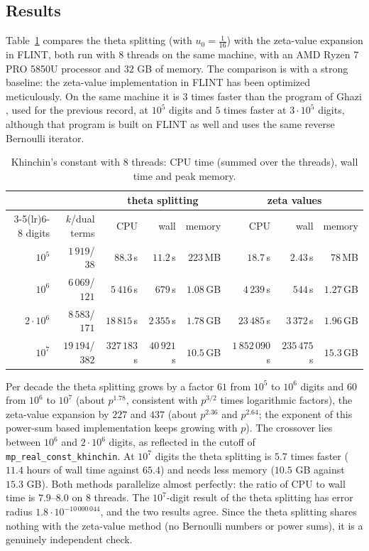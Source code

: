 \documentclass[11pt]{amsart}
\theoremstyle{definition}
\theoremstyle{remark}
\begin{document}
\subsection{Results}\label{sec:khresults}
Table~\ref{tab:khinchin} compares the theta splitting (with $u_0 = \frac1{16}$) with the zeta-value expansion in FLINT,
both run with $8$ threads on the same machine, with an AMD Ryzen 7 PRO 5850U processor and $32$ GB of memory. The
comparison is with a strong baseline: the zeta-value implementation in FLINT has been optimized meticulously. On the
same machine it is $3$ times faster than the program of Ghazi \cite{Gha26}, used for the previous record, at $10^5$
digits and $5$ times faster at $3\cdot10^5$ digits, although that program is built on FLINT as well and uses the same
reverse Bernoulli iterator.
\begin{table}[ht]
\centering\footnotesize
\setlength{\tabcolsep}{3.5pt}
\begin{tabular}{rrrrrrrr}
\toprule
& & \multicolumn{3}{c}{theta splitting} & \multicolumn{3}{c}{zeta values} \\
\cmidrule(lr){3-5}\cmidrule(lr){6-8}
digits & $k$/dual terms & CPU & wall & memory & CPU & wall & memory \\
\midrule
$10^5$ & $1\,919$/$38$ & $88.3$\,s & $11.2$\,s & $223$\,MB & $18.7$\,s & $2.43$\,s & $78$\,MB \\
$10^6$ & $6\,069$/$121$ & $5\,416$\,s & $679$\,s & $1.08$\,GB & $4\,239$\,s & $544$\,s & $1.27$\,GB \\
$2\cdot10^6$ & $8\,583$/$171$ & $18\,815$\,s & $2\,355$\,s & $1.78$\,GB & $23\,485$\,s & $3\,372$\,s & $1.96$\,GB \\
$10^7$ & $19\,194$/$382$ & $327\,183$\,s & $40\,921$\,s & $10.5$\,GB & $1\,852\,090$\,s & $235\,475$\,s & $15.3$\,GB \\
\bottomrule
\end{tabular}
\vspace{\abovecaptionskip}
\caption{Khinchin's constant with $8$ threads: CPU time (summed over the threads), wall time and peak memory.}
\label{tab:khinchin}
\end{table}
Per decade the theta splitting grows by a factor $61$ from $10^5$ to $10^6$ digits and $60$ from $10^6$ to $10^7$ (about
$p^{1.78}$, consistent with $p^{3/2}$ times logarithmic factors), the zeta-value expansion by $227$ and $437$ (about
$p^{2.36}$ and $p^{2.64}$; the exponent of this power-sum based implementation keeps growing with $p$). The crossover
lies between $10^6$ and $2\cdot10^6$ digits, as reflected in the cutoff of \texttt{mp\_real\_const\_khinchin}. At $10^7$
digits the theta splitting is $5.7$ times faster ($11.4$ hours of wall time against $65.4$) and needs less memory
($10.5$ GB against $15.3$ GB). Both methods parallelize almost perfectly: the ratio of CPU to wall time is $7.9$--$8.0$ on
$8$ threads. The $10^7$-digit result of the theta splitting has error radius $1.8\cdot10^{-10\,000\,044}$, and the
two results agree. Since the theta splitting shares nothing with the zeta-value method (no Bernoulli numbers or power
sums), it is a genuinely independent check.
\end{document}
